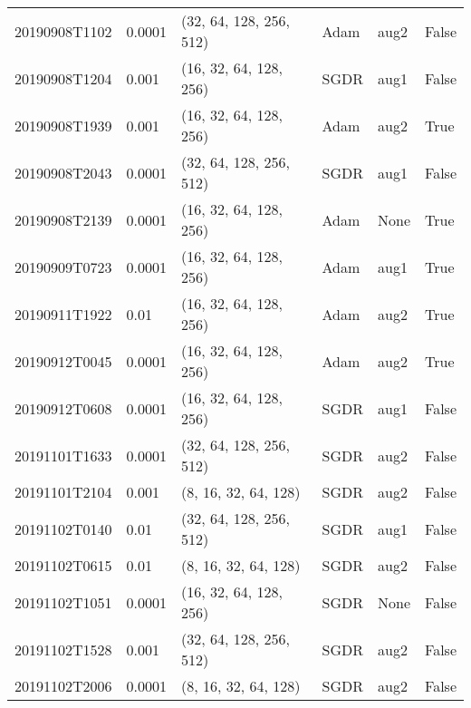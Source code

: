 \begin{table}[!ht]
\begin{tabular}{llllll}
			20190908T1102 &       0.0001 &  (32, 64, 128, 256, 512) &      Adam &                  aug2 &                  False \\
			20190908T1204 &        0.001 &   (16, 32, 64, 128, 256) &      SGDR &                  aug1 &                  False \\
			20190908T1939 &        0.001 &   (16, 32, 64, 128, 256) &      Adam &                  aug2 &                   True \\
			20190908T2043 &       0.0001 &  (32, 64, 128, 256, 512) &      SGDR &                  aug1 &                  False \\
			20190908T2139 &       0.0001 &   (16, 32, 64, 128, 256) &      Adam &                  None &                   True \\
			20190909T0723 &       0.0001 &   (16, 32, 64, 128, 256) &      Adam &                  aug1 &                   True \\
			20190911T1922 &         0.01 &   (16, 32, 64, 128, 256) &      Adam &                  aug2 &                   True \\
			20190912T0045 &       0.0001 &   (16, 32, 64, 128, 256) &      Adam &                  aug2 &                   True \\
			20190912T0608 &       0.0001 &   (16, 32, 64, 128, 256) &      SGDR &                  aug1 &                  False \\
			20191101T1633 &       0.0001 &  (32, 64, 128, 256, 512) &      SGDR &                  aug2 &                  False \\
			20191101T2104 &        0.001 &     (8, 16, 32, 64, 128) &      SGDR &                  aug2 &                  False \\
			20191102T0140 &         0.01 &  (32, 64, 128, 256, 512) &      SGDR &                  aug1 &                  False \\
			20191102T0615 &         0.01 &     (8, 16, 32, 64, 128) &      SGDR &                  aug2 &                  False \\
			20191102T1051 &       0.0001 &   (16, 32, 64, 128, 256) &      SGDR &                  None &                  False \\
			20191102T1528 &        0.001 &  (32, 64, 128, 256, 512) &      SGDR &                  aug2 &                  False \\
			20191102T2006 &       0.0001 &     (8, 16, 32, 64, 128) &      SGDR &                  aug2 &                  False \\

\end{tabular}
\end{table}
